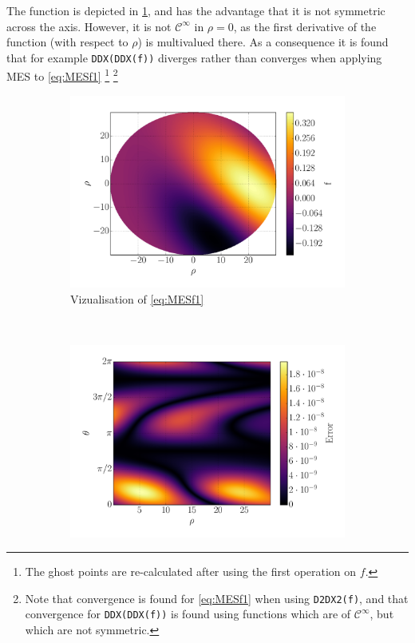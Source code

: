 %
The function is depicted in \cref{fig:typicalMES}, and has the advantage that it is not symmetric across the axis.
However, it is not $\mathcal{C}^\infty$ in $\rho=0$, as the first derivative of the function (with respect to $\rho$) is multivalued there.
As a consequence it is found that for example \texttt{DDX(DDX(f))} diverges rather than converges when applying MES to \cref{eq:MESf1}%
%
\footnote{The ghost points are re-calculated after using the first operation on $f$.}
\footnote{Note that convergence is found for \cref{eq:MESf1} when using \texttt{D2DX2(f)}, and that convergence for \texttt{DDX(DDX(f))} is found using functions which are of $\mathcal{C}^\infty$, but which are not symmetric.}
%
\begin{figure}[t!]
    \centering
    \begin{subfigure}[t]{0.45\textwidth}
        \centering
        \includegraphics[width=1.0\textwidth]{fig/f}
        \caption{Vizualisation of \cref{eq:MESf1}}
        \label{fig:typicalMES}
    \end{subfigure}%
    ~
    \begin{subfigure}[t]{0.45\textwidth}
        \centering
        \includegraphics[width=1.0\textwidth]{fig/err}

\end{subfigure}
\end{figure}
